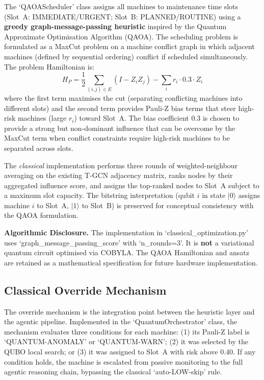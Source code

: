 The `QAOAScheduler' class assigns all machines to maintenance time slots (Slot~A: IMMEDIATE/URGENT; Slot~B: PLANNED/ROUTINE) using a \textbf{greedy graph-message-passing heuristic} inspired by the Quantum Approximate Optimisation Algorithm (QAOA). The scheduling problem is formulated as a MaxCut problem on a machine conflict graph in which adjacent machines (defined by sequential ordering) conflict if scheduled simultaneously. The problem Hamiltonian is:
\begin{equation}
H_P = \frac{1}{2} \sum_{(i,j) \in E} (I - Z_i Z_j) - \sum_i r_i \cdot 0.3 \cdot Z_i
\label{eq:qaoa_hamiltonian}
\end{equation}
where the first term maximises the cut (separating conflicting machines into different slots) and the second term provides Pauli-Z bias terms that steer high-risk machines (large $r_i$) toward Slot~A. The bias coefficient 0.3 is chosen to provide a strong but non-dominant influence that can be overcome by the MaxCut term when conflict constraints require high-risk machines to be separated across slots.

The \emph{classical} implementation performs three rounds of weighted-neighbour averaging on the existing T-GCN adjacency matrix, ranks nodes by their aggregated influence score, and assigns the top-ranked nodes to Slot~A subject to a maximum slot capacity. The bitstring interpretation (qubit $i$ in state $|0\rangle$ assigns machine $i$ to Slot~A, $|1\rangle$ to Slot~B) is preserved for conceptual consistency with the QAOA formulation.

\textbf{Algorithmic Disclosure.} The implementation in `classical_optimization.py' uses `graph_message_passing_score' with `n_rounds=3'. It is \textbf{not} a variational quantum circuit optimised via COBYLA. The QAOA Hamiltonian and ansatz are retained as a mathematical specification for future hardware implementation.

\subsection{Classical Override Mechanism}

The override mechanism is the integration point between the heuristic layer and the agentic pipeline. Implemented in the `QuantumOrchestrator' class, the mechanism evaluates three conditions for each machine: (1) its Pauli-Z label is `QUANTUM-ANOMALY' or `QUANTUM-WARN'; (2) it was selected by the QUBO local search; or (3) it was assigned to Slot~A with risk above 0.40. If any condition holds, the machine is escalated from passive monitoring to the full agentic reasoning chain, bypassing the classical `auto-LOW-skip' rule.

